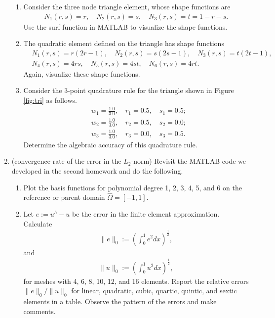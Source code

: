\documentclass[12pt]{article}
\begin{document}
\begin{enumerate}
\begin{enumerate}
\item Consider the three node triangle element, whose shape functions are 
\begin{align*}
N_1(r,s) = r, \quad N_2(r,s) = s, \quad N_3(r,s) = t = 1 - r - s.
\end{align*}
Use the surf function in MATLAB to visualize the shape functions.

\item The quadratic element defined on the triangle has shape functions
\begin{align*}
& N_1(r,s) = r(2r-1), \quad N_2(r,s) = s(2s-1), \quad N_3(r,s) = t(2t-1), \\
& N_4(r,s) = 4rs, \quad N_5(r,s) = 4st, \quad N_6(r,s) = 4rt.
\end{align*}
Again, visualize these shape functions.

\item Consider the 3-point quadrature rule for the triangle shown in Figure \ref{fig:tri} as follows.
\begin{align*}
&w_1 = \frac{1.0}{3.0}, \quad r_1 = 0.5, \quad s_1 = 0.5; \\
&w_2= \frac{1.0}{3.0}, \quad r_2 = 0.5, \quad s_2 = 0.0;\\
&w_3 = \frac{1.0}{3.0}, \quad r_3 = 0.0, \quad s_3 = 0.5.
\end{align*}
Determine the algebraic accuracy of this quadrature rule.
\end{enumerate}



\item (convergence rate of the error in the $L_2$-norm) Revisit the MATLAB code we developed in the second homework and do the following.
\begin{enumerate}
\item Plot the basis functions for polynomial degree 1, 2, 3, 4, 5, and 6 on the reference or parent domain $\hat{\Omega}=[-1,1]$.
\item Let $e:=u^h - u$ be the error in the finite element approximation. Calculate
\begin{align*}
\|e\|_0 := \left( \int_0^1  e^2 dx \right)^{\frac12},
\end{align*}
and 
\begin{align*}
\|u\|_0 := \left( \int_0^1  u^2 dx \right)^{\frac12},
\end{align*}
for meshes with 4, 6, 8, 10, 12, and 16 elements. Report the relative errors $\|e\|_0/\|u\|_0$ for linear, quadratic, cubic, quartic, quintic, and sextic elements in a table. Observe the pattern of the errors and make comments.
\end{enumerate}
\end{enumerate}
\end{document}
